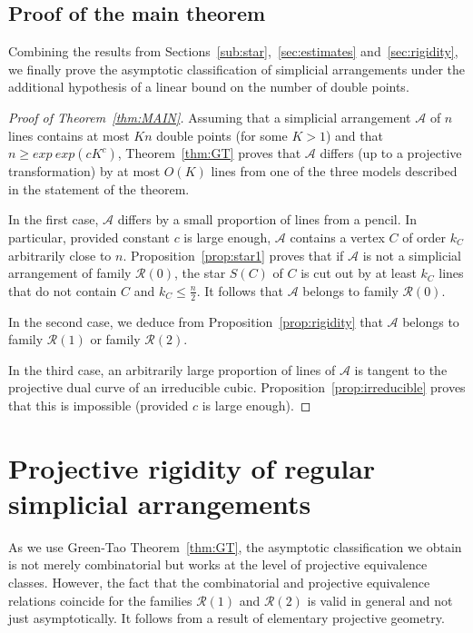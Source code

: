 \documentclass[a4paper,11pt,reqno]{amsart}
\theoremstyle{definition}
\theoremstyle{remark}
\theoremstyle{definition}
\theoremstyle{definition}
\theoremstyle{definition}
\numberwithin{equation}{section}
\begin{document}
\subsection{Proof of the main theorem}\label{sub:PROOF}

Combining the results from Sections~\ref{sub:star},~\ref{sec:estimates} and~\ref{sec:rigidity}, we finally prove the asymptotic classification of simplicial arrangements under the additional hypothesis of a linear bound on the number of double points.

\begin{proof}[Proof of Theorem~\ref{thm:MAIN}]
Assuming that a simplicial arrangement $\mathcal{A}$ of $n$ lines contains at most $Kn$ double points (for some $K>1$) and that $n \geq  exp~exp (cK^{c})$, Theorem~\ref{thm:GT} proves that $\mathcal{A}$ differs (up to a projective transformation) by at most $O(K)$ lines from one of the three models described in the statement of the theorem.
\par
In the first case, $\mathcal{A}$ differs by a small proportion of lines from a pencil. In particular, provided constant $c$ is large enough, $\mathcal{A}$ contains a vertex $C$ of order $k_{C}$ arbitrarily close to $n$. Proposition~\ref{prop:star1} proves that if $\mathcal{A}$ is not a simplicial arrangement of family $\mathcal{R}(0)$, the star $S(C)$ of $C$ is cut out by at least $k_{C}$ lines that do not contain $C$ and $k_{C} \leq \frac{n}{2}$. It follows that $\mathcal{A}$ belongs to family $\mathcal{R}(0)$.
\par
In the second case, we deduce from Proposition~\ref{prop:rigidity} that $\mathcal{A}$ belongs to family $\mathcal{R}(1)$ or family $\mathcal{R}(2)$.
\par
In the third case, an arbitrarily large proportion of lines of $\mathcal{A}$ is tangent to the projective dual curve of an irreducible cubic. Proposition~\ref{prop:irreducible} proves that this is impossible (provided $c$ is large enough).
\end{proof}

\appendix

\section{Projective rigidity of regular simplicial arrangements}

As we use Green-Tao Theorem~\ref{thm:GT}, the asymptotic classification we obtain is not merely combinatorial but works at the level of projective equivalence classes. However, the fact that the combinatorial and projective equivalence relations coincide for the families $\mathcal{R}(1)$ and $\mathcal{R}(2)$ is valid in general and not just asymptotically. It follows from a result of elementary projective geometry.
\end{document}
